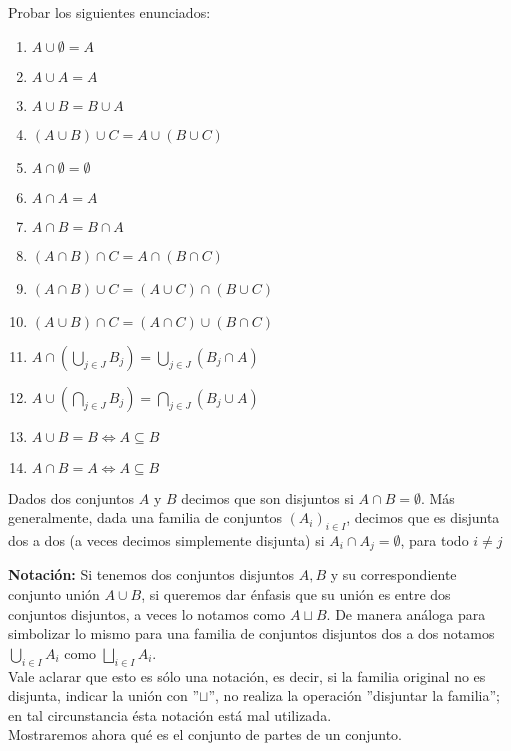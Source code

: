 \documentclass[12pt,a4paper]{book}
\begin{document}
\begin{ej} %
Probar los siguientes enunciados:
\begin{enumerate}
\item $A \cup \emptyset = A$
\item $A \cup A = A $
\item $A \cup B = B \cup A$
\item $(A \cup B) \cup C = A \cup (B \cup C) $
\item $A \cap \emptyset = \emptyset$
\item $A \cap A = A $
\item $A \cap B = B \cap A$
\item $(A \cap B) \cap C = A \cap (B \cap C) $
\item $(A \cap B) \cup C = (A \cup C) \cap (B \cup C) $
\item $(A \cup B) \cap C = (A \cap C) \cup (B \cap C) $
\item $A \cap (\bigcup_{j \in J} B_{j}) = \bigcup_{j \in J} (B_{j} \cap A)$
\item $A \cup (\bigcap_{j \in J} B_{j}) = \bigcap_{j \in J} (B_{j} \cup A)$
\item $ A \cup B = B \Leftrightarrow A \subseteq B$
\item $ A \cap B = A \Leftrightarrow A \subseteq B$
\end{enumerate}
\end{ej}

\begin{defi} %
Dados dos conjuntos $A$ y $B$ decimos que son disjuntos si $A \cap B = \emptyset$. Más generalmente, dada una familia de conjuntos $(A_i)_{i \in I}$, decimos que es disjunta dos a dos (a veces decimos simplemente disjunta) si $A_i \cap A_j = \emptyset$, para todo $i \neq j$
\end{defi}

\textbf{Notación:} Si tenemos dos conjuntos disjuntos $A,B$ y su correspondiente conjunto unión $A \cup B$, si queremos dar énfasis que su unión es entre dos conjuntos disjuntos, a veces lo notamos como $ A \sqcup B$. De manera análoga para simbolizar lo mismo para una familia de conjuntos disjuntos dos a dos notamos $ \bigcup_{i \in I} A_i$ como $\bigsqcup_{i \in I} A_i $. \\
Vale aclarar que esto es sólo una notación, es decir, si la familia original no es disjunta, indicar la unión con ''$\sqcup$'', no realiza la operación ''disjuntar la familia''; en tal circunstancia ésta notación está mal utilizada.\\[0.5 cm]
Mostraremos ahora qué es el conjunto de partes de un conjunto.
\end{document}
